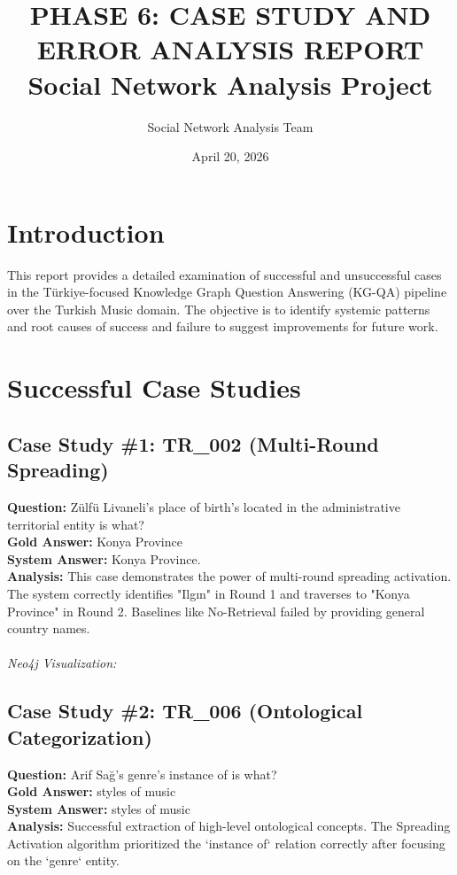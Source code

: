 \documentclass{article}
\title{PHASE 6: CASE STUDY AND ERROR ANALYSIS REPORT \\ Social Network Analysis Project}
\author{Social Network Analysis Team}
\date{April 20, 2026}
\begin{document}
\maketitle

\section{Introduction}
This report provides a detailed examination of successful and unsuccessful cases in the Türkiye-focused Knowledge Graph Question Answering (KG-QA) pipeline over the Turkish Music domain. The objective is to identify systemic patterns and root causes of success and failure to suggest improvements for future work.

\section{Successful Case Studies}

\subsection{Case Study \#1: TR\_002 (Multi-Round Spreading)}
\textbf{Question:} Zülfü Livaneli's place of birth's located in the administrative territorial entity is what? \\
\textbf{Gold Answer:} Konya Province \\
\textbf{System Answer:} Konya Province. \\
\textbf{Analysis:} This case demonstrates the power of multi-round spreading activation. The system correctly identifies "Ilgın" in Round 1 and traverses to "Konya Province" in Round 2. Baselines like No-Retrieval failed by providing general country names.
\\ \\
\textit{Neo4j Visualization:}
\begin{center}
\end{center}

\subsection{Case Study \#2: TR\_006 (Ontological Categorization)}
\textbf{Question:} Arif Sağ's genre's instance of is what? \\
\textbf{Gold Answer:} styles of music \\
\textbf{System Answer:} styles of music \\
\textbf{Analysis:} Successful extraction of high-level ontological concepts. The Spreading Activation algorithm prioritized the `instance of` relation correctly after focusing on the `genre` entity.
\end{document}

